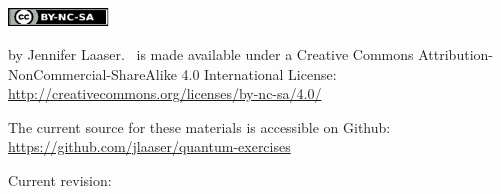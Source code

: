 %
%
%

\begin{titlepage}
\makeatletter
\centering

~

\vspace{1.5in}
{\LARGE \@title }
\vspace{0.5in}



\includegraphics[width=0.2\textwidth]{by-nc-sa}
\vspace{0.1in}

\begin{minipage}{0.75\textwidth}
 by Jennifer Laaser. \@title\ is made available under a Creative Commons Attribution-NonCommercial-ShareAlike 4.0 International License: \url{http://creativecommons.org/licenses/by-nc-sa/4.0/}

\vspace{0.1in}

The current source for these materials is accessible on Github:\\ \url{https://github.com/jlaaser/quantum-exercises}
\end{minipage}


\vspace{0.5in}
Current revision: \@date

\end{titlepage}

\makeatother
\newpage